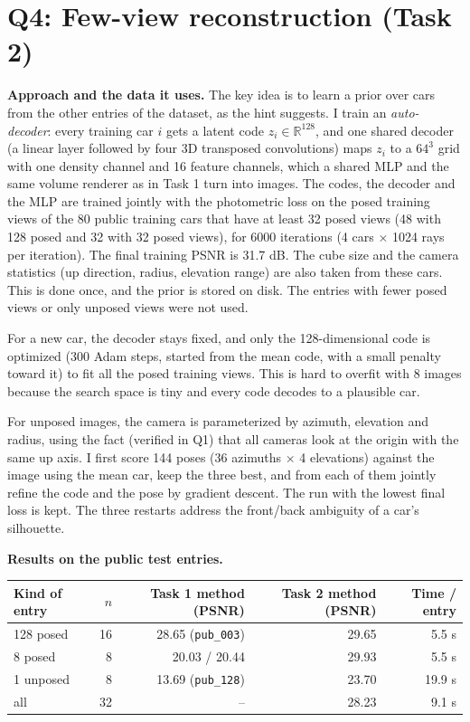 \documentclass[11pt]{article}
\begin{document}
\section*{Q4: Few-view reconstruction (Task 2)}

\textbf{Approach and the data it uses.}
The key idea is to learn a prior over cars from the other entries of the dataset, as the hint suggests. I train an \emph{auto-decoder}: every training car $i$ gets a latent code $z_i\in\mathbb{R}^{128}$, and one shared decoder (a linear layer followed by four 3D transposed convolutions) maps $z_i$ to a $64^3$ grid with one density channel and 16 feature channels, which a shared MLP and the same volume renderer as in Task 1 turn into images. The codes, the decoder and the MLP are trained jointly with the photometric loss on the posed training views of the 80 public training cars that have at least 32 posed views (48 with 128 posed and 32 with 32 posed views), for 6000 iterations (4 cars $\times$ 1024 rays per iteration). The final training PSNR is 31.7 dB. The cube size and the camera statistics (up direction, radius, elevation range) are also taken from these cars. This is done once, and the prior is stored on disk. The entries with fewer posed views or only unposed views were not used.

For a new car, the decoder stays fixed, and only the 128-dimensional code is optimized (300 Adam steps, started from the mean code, with a small penalty toward it) to fit all the posed training views. This is hard to overfit with 8 images because the search space is tiny and every code decodes to a plausible car.

For unposed images, the camera is parameterized by azimuth, elevation and radius, using the fact (verified in Q1) that all cameras look at the origin with the same up axis. I first score 144 poses (36 azimuths $\times$ 4 elevations) against the image using the mean car, keep the three best, and from each of them jointly refine the code and the pose by gradient descent. The run with the lowest final loss is kept. The three restarts address the front/back ambiguity of a car's silhouette.

\textbf{Results on the public test entries.}

\begin{center}
\begin{tabular}{lrrrr}
\toprule
Kind of entry & $n$ & Task 1 method (PSNR) & Task 2 method (PSNR) & Time / entry\\
\midrule
128 posed & 16 & 28.65 (\texttt{pub\_003}) & 29.65 & 5.5 s\\
8 posed & 8 & 20.03 / 20.44 & 29.93 & 5.5 s\\
1 unposed & 8 & 13.69 (\texttt{pub\_128}) & 23.70 & 19.9 s\\
\midrule
all & 32 & -- & 28.23 & 9.1 s\\
\bottomrule
\end{tabular}
\end{center}
\end{document}
